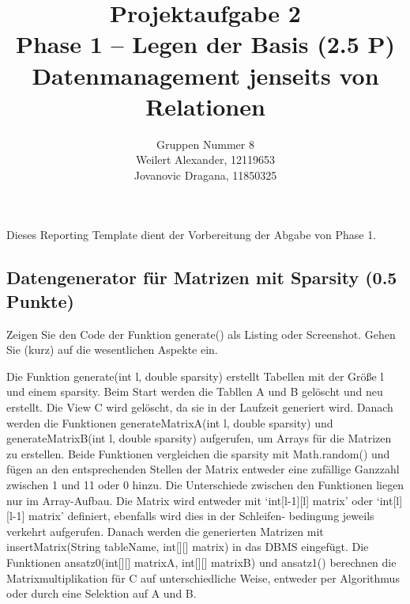 \documentclass[11pt]{scrartcl}
\title{
  \textbf{\large Projektaufgabe 2 } \\
  Phase 1 – Legen der Basis (2.5 P) \\
  {\large Datenmanagement jenseits von Relationen}
}
\author{
  Gruppen Nummer 8 \\
  \large Weilert Alexander, 12119653 \\
  \large Jovanovic Dragana, 11850325
}
\begin{document}
\maketitle\thispagestyle{empty}

Dieses Reporting Template dient der Vorbereitung der Abgabe von Phase 1.

\subsection*{Datengenerator für Matrizen mit Sparsity (0.5 Punkte)}

Zeigen Sie den Code der Funktion generate() als Listing oder Screenshot.
Gehen Sie (kurz) auf die wesentlichen Aspekte ein.

Die Funktion generate(int l, double sparsity) erstellt Tabellen mit der Größe l und einem sparsity.
Beim Start werden die Tabllen A und B gelöscht und neu erstellt. 
Die View C wird gelöscht, da sie in der Laufzeit generiert wird.
Danach werden die Funktionen generateMatrixA(int l, double sparsity) und generateMatrixB(int l, double sparsity) aufgerufen, um Arrays für die Matrizen zu erstellen. 
Beide Funktionen vergleichen die sparsity mit Math.random() und fügen an den entsprechenden Stellen der Matrix entweder eine zufällige Ganzzahl zwischen 1 und 11 oder 0 hinzu.
Die Unterschiede zwischen den Funktionen liegen nur im Array-Aufbau. 
Die Matrix wird entweder mit `int[l-1][l] matrix' oder `int[l][l-1] matrix' definiert, ebenfalls wird dies in der Schleifen- bedingung jeweils verkehrt aufgerufen.
Danach werden die generierten Matrizen mit insertMatrix(String tableName, int[][] matrix) in das DBMS eingefügt. 
Die Funktionen ansatz0(int[][] matrixA, int[][] matrixB) und ansatz1() berechnen die Matrixmultiplikation für C auf unterschiedliche Weise, entweder per Algorithmus oder durch eine Selektion auf A und B. 
\end{document}
